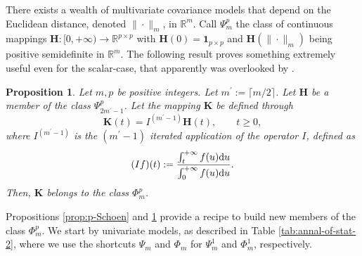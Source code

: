 \documentclass[12pt]{article}
\theoremstyle{plain}
\newtheorem{proposition}{Proposition}
\theoremstyle{remark}
\newcommand{\R}[0]{\mathbb{R}}
\newcommand{\onepp}[0]{{\mathbf{1}_{p\times p}}}
\newcommand{\latMatr}[1]{\mathbf{#1}}          %
\begin{document}
There exists a wealth of multivariate covariance  models that depend on the Euclidean distance, denoted $\|\cdot\|_{m}$, in $\mathbb{R}^m$. Call $\Psi_m^p$ the class of {continuous} mappings $\latMatr H: [0,+\infty) \to \R^{p \times p}$ with $\latMatr H(0)= \onepp$ and $\latMatr H(\|\cdot\|_m)$ being positive {semi}definite in $\R^m$. The following result proves something extremely useful even for the scalar-case, that apparently was overlooked by \cite{anderes_isotropic_2020}. 

\begin{proposition}
    \label{prop:PleaseEmilioChooseWiseLabels} 
    Let $m,p$ be positive integers. {Let $m^\prime:=\lceil m/2 \rceil$.} Let $\latMatr H$ be a member of the class $\Psi_{2{m^\prime}-1}^p$. Let the mapping ${\latMatr{K}}$ be defined through
    \begin{equation}
        \label{eq:K} 
        {\latMatr{K}}(t) = I^{({m^\prime}-1)} \latMatr H(t), \qquad t \ge 0,
    \end{equation}
    where $I^{({m^\prime}-1)}$ is the $({m^\prime}-1)$ iterated application of the operator $I$, defined as 
    \begin{equation*}  
        (If)(t) := \frac{\int_{t}^{+\infty} f(u) {\rm d} u}{\int_{0}^{+\infty} f(u) {\rm d} u}.
    \end{equation*}
    Then, ${\mathbf{K}}$ belongs to the class $\Phi_m^p$.
\end{proposition}
Propositions \ref{prop:p-Schoen} and \ref{prop:PleaseEmilioChooseWiseLabels} provide a recipe to build new members of the class $\Phi_m^p$. We start by {univariate models, as described in Table \ref{tab:annal-of-stat-2}, where} %
we use the shortcuts $\Psi_m$ and $\Phi_m$ for $\Psi_m^1$ and $\Phi_m^1$, respectively. 
\end{document}
